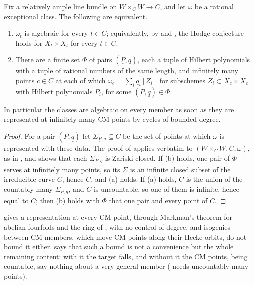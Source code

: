 \begin{corollary}\label{cor:mumfordbounded}
Fix a relatively ample line bundle on $W\times_{C}W\to C$, and let $\omega$ be
a rational exceptional class. The following are equivalent.
\begin{enumerate}[label=\textup{(\alph*)},leftmargin=2.6em,itemsep=2pt]
\item $\omega_{t}$ is algebraic for every $t\in C$; equivalently, by
   and , the Hodge conjecture
  holds for $X_{t}\times X_{t}$ for every $t\in C$.
\item There are a finite set $\Phi$ of pairs $(\underline{P},\underline{q})$,
  each a tuple of Hilbert polynomials with a tuple of rational numbers of the
  same length, and infinitely many points $c\in C$ at each of which
  $\omega_{c}=\sum_{i}q_{i}[Z_{i}]$ for subschemes $Z_{i}\subset X_{c}\times
  X_{c}$ with Hilbert polynomials $P_{i}$, for some $(\underline{P},
  \underline{q})\in\Phi$.
\end{enumerate}
In particular the classes are algebraic on every member as soon as they are
represented at infinitely many CM points by cycles of bounded degree.
\end{corollary}

\begin{proof}
For a pair $(\underline{P},\underline{q})$ let $\Sigma_{\underline{P},
\underline{q}}\subseteq C$ be the set of points at which $\omega$ is
represented with these data. The proof of  applies
verbatim to $(W\times_{C}W,C,\omega)$, as in , and shows
that each $\Sigma_{\underline{P},\underline{q}}$ is Zariski closed. If (b)
holds, one pair of $\Phi$ serves at infinitely many points, so its
$\Sigma$ is an infinite closed subset of the irreducible curve $C$, hence
$C$, and (a) holds. If (a) holds, $C$ is the union of the countably many
$\Sigma_{\underline{P},\underline{q}}$, and $C$ is uncountable, so one of
them is infinite, hence equal to $C$; then (b) holds with $\Phi$ that one
pair and every point of $C$.
\end{proof}

 gives a representation at every CM point, through
Markman's theorem for abelian fourfolds \cite{Mar25a} and the ring of
, with no control of degree, and isogenies between CM
members, which move CM points along their Hecke orbits, do not bound it
either.  says that such a bound is not a convenience
but the whole remaining content: with it the target falls, and without it the
CM points, being countable, say nothing about a very general member
( needs uncountably many points).

